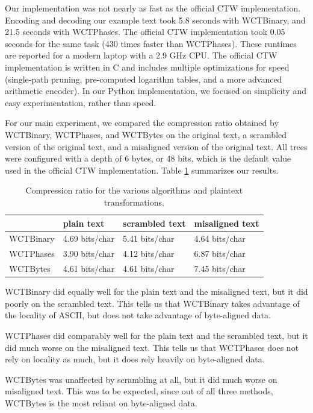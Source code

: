 \documentclass[11pt]{scrartcl}
\begin{document}
Our implementation was not nearly as fast as the official CTW implementation.
Encoding and decoding our example text took 5.8 seconds with WCTBinary, and
21.5 seconds with WCTPhases. The official CTW implementation took 0.05 seconds
for the same task (430 times faster than WCTPhases). These runtimes are
reported for a modern laptop with a 2.9 GHz CPU. The official CTW
implementation is written in C and includes multiple optimizations for speed
(single-path pruning, pre-computed logarithm tables, and a more advanced
arithmetic encoder). In our Python implementation, we focused on simplicity and
easy experimentation, rather than speed.

For our main experiment, we compared the compression ratio obtained by
WCTBinary, WCTPhases, and WCTBytes on the original text, a scrambled version of
the original text, and a misaligned version of the original text. All trees
were configured with a depth of 6 bytes, or 48 bits, which is the default value
used in the official CTW implementation. Table \ref{tab:results} summarizes our
results.

\begin{table}[h!]
    \centering
    \begin{tabular}{l|lll}
        & plain text & scrambled text & misaligned text \\
        \hline
        WCTBinary & 4.69 bits/char & 5.41 bits/char & 4.64 bits/char \\
        WCTPhases & 3.90 bits/char & 4.12 bits/char & 6.87 bits/char \\
        WCTBytes  & 4.61 bits/char & 4.61 bits/char & 7.45 bits/char \\
    \end{tabular}
    \caption{Compression ratio for the various algorithms and plaintext
    transformations.}
    \label{tab:results}
\end{table}

WCTBinary did equally well for the plain text and the misaligned text, but it
did poorly on the scrambled text. This tells us that WCTBinary takes advantage
of the locality of ASCII, but does not take advantage of byte-aligned data.

WCTPhases did comparably well for the plain text and the scrambled text, but it
did much worse on the misaligned text. This tells us that WCTPhases does not
rely on locality as much, but it does rely heavily on byte-aligned data.

WCTBytes was unaffected by scrambling at all, but it did much worse on
misaligned text. This was to be expected, since out of all three methods,
WCTBytes is the most reliant on byte-aligned data.
\end{document}
